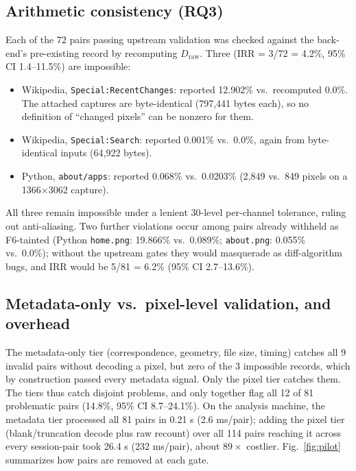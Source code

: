 \documentclass[conference]{IEEEtran}
\newcommand{\Dw}{D_{\mathrm{raw}}}
\begin{document}
\subsection{Arithmetic consistency (RQ3)}
Each of the 72 pairs passing upstream validation was checked against the back-end's pre-existing record by recomputing $\Dw$. Three (IRR = 3/72 = 4.2\%, 95\% CI 1.4--11.5\%) are impossible:
\begin{itemize}
\item Wikipedia, \texttt{Special:RecentChanges}: reported 12.902\% vs.\ recomputed 0.0\%. The attached captures are byte-identical (797,441 bytes each), so no definition of ``changed pixels'' can be nonzero for them.
\item Wikipedia, \texttt{Special:Search}: reported 0.001\% vs.\ 0.0\%, again from byte-identical inputs (64,922 bytes).
\item Python, \texttt{about/apps}: reported 0.068\% vs.\ 0.0203\% (2,849 vs.\ 849 pixels on a 1366$\times$3062 capture).
\end{itemize}
All three remain impossible under a lenient 30-level per-channel tolerance, ruling out anti-aliasing. Two further violations occur among pairs already withheld as F6-tainted (Python \texttt{home.png}: 19.866\% vs.\ 0.089\%; \texttt{about.png}: 0.055\% vs.\ 0.0\%); without the upstream gates they would masquerade as diff-algorithm bugs, and IRR would be 5/81 = 6.2\% (95\% CI 2.7--13.6\%).



\subsection{Metadata-only vs.\ pixel-level validation, and overhead}
The metadata-only tier (correspondence, geometry, file size, timing) catches all 9 invalid pairs without decoding a pixel, but zero of the 3 impossible records, which by construction passed every metadata signal. Only the pixel tier catches them. The tiers thus catch disjoint problems, and only together flag all 12 of 81 problematic pairs (14.8\%, 95\% CI 8.7--24.1\%). On the analysis machine, the metadata tier processed all 81 pairs in 0.21 s (2.6 ms/pair); adding the pixel tier (blank/truncation decode plus raw recount) over all 114 pairs reaching it across every session-pair took 26.4 s (232 ms/pair), about $89\times$ costlier. Fig.~\ref{fig:pilot} summarizes how pairs are removed at each gate.
\end{document}

